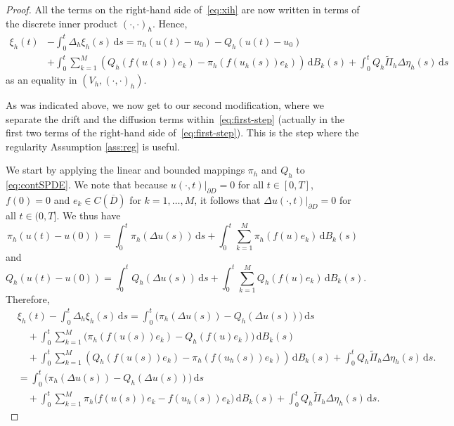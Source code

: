 \documentclass[12pt]{article}
\newcommand{\dd}{\,\mathrm{d}}
\begin{document}
{\begin{proof}
All the terms on the right-hand side of~\eqref{eq:xih} are now written in terms of the discrete inner product $(\cdot,\cdot)_h$. Hence, 
%
\begin{align}
\label{eq:first-step}
\xi_h(t) &- \int_0^t \Delta_h \xi_h(s) \dd s 
= \pi_h(u(t) - u_0) - Q_h(u(t) - u_0)\nonumber\\
    &+ \int_0^t \sum_{k=1}^M (Q_h(f(u(s))e_k) - \pi_h(f(u_h(s))e_k)) \dd B_k(s) + \int_0^t Q_h \tilde{\Pi}_h \Delta \eta_h(s) \dd s
\end{align}
%
as an equality in $\left(V_h,(\cdot,\cdot)_h\right)$. 

\smallskip 

As was indicated above, we now get to our second modification, where we separate the drift and the diffusion terms within~\eqref{eq:first-step} (actually in the first two terms of the right-hand side of~\eqref{eq:first-step}). This is the step where the regularity Assumption \ref{ass:reg} is useful. 

We start by applying the linear and bounded mappings $\pi_h$ and $Q_h$ to \eqref{eq:contSPDE}. We note that because $u(\cdot,t)|_{\partial D} = 0$ for all $t \in [0,T]$, $f(0)=0$ and $e_k \in C(\overline{D})$ for $k=1,\ldots,M$, it follows that $\Delta u(\cdot,t)|_{\partial D}=0$ for all $t \in (0,T]$. We thus have
%
\begin{equation*}
    \pi_h (u(t) - u(0)) = \int_0^t {\pi}_h (\Delta u(s)) \dd s + \int_0^t \sum_{k=1}^M \pi_h (f(u)e_k) \dd B_k(s)
\end{equation*}
and 
\begin{equation*}
    Q_h (u(t) - u(0)) = \int_0^t {Q}_h (\Delta u(s)) \dd s + \int_0^t \sum_{k=1}^M Q_h (f(u)e_k) \dd B_k(s).
\end{equation*}
Therefore, 
%
\begin{align}
\label{eq:second-step}
&\xi_h(t) - \int_0^t \Delta_h \xi_h(s) \dd s = \int_0^t \big ({\pi}_h (\Delta u(s)) - {Q}_h (\Delta u(s))\big) \dd s \nonumber\\
&\quad + \int_0^t \sum_{k=1}^M \big(\pi_h (f(u(s))e_k)  - Q_h (f(u)e_k)\big) \dd B_k(s)\nonumber\\
    &\quad + \int_0^t \sum_{k=1}^M (Q_h(f(u(s))e_k) - \pi_h(f(u_h(s))e_k)) \dd B_k(s)  +  \int_0^t Q_h \tilde{\Pi}_h \Delta \eta_h(s) \dd s.\nonumber\\
&= \int_0^t \big ({\pi}_h (\Delta u(s)) -{Q}_h (\Delta u(s))\big) \dd s \nonumber\\
    &\quad + \int_0^t \sum_{k=1}^M \pi_h\big(f(u(s))e_k - f(u_h(s))e_k\big) \dd B_k(s) + \int_0^t Q_h \tilde{\Pi}_h \Delta \eta_h(s) \dd s.
\end{align}


\end{proof}}
\end{document}
